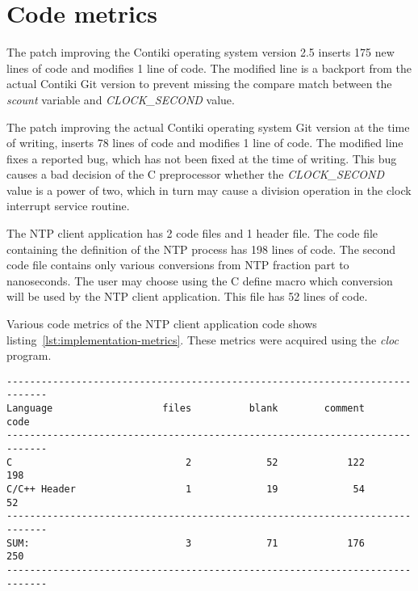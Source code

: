 
\section{Code metrics}
The patch improving the Contiki operating system version 2.5
inserts 175 new lines of code and modifies 1 line of code.
The modified line is a backport from the actual Contiki Git version to prevent
missing the compare match between the {\it{scount}} variable and {\it{CLOCK\_SECOND}} value.

The patch improving the actual Contiki operating system Git version at the time of writing,
inserts 78 lines of code and modifies 1 line of code.
The modified line fixes a reported bug, which has not been fixed at the time of writing.
This bug causes a bad decision of the C preprocessor whether the {\it{CLOCK\_SECOND}}
value is a power of two, which in turn may cause a division operation in
the clock interrupt service routine.

The NTP client application has 2 code files and 1 header file.
The code file containing the definition of the NTP process
has 198 lines of code.
The second code file contains only various conversions from NTP fraction part
to nanoseconds.
The user may choose using the C define macro which conversion will be used
by the NTP client application.
This file has 52 lines of code.

Various code metrics of the NTP client application code
shows listing~\ref{lst:implementation-metrics}.
These metrics were acquired using the {\it{cloc}} program.
\begin{lstlisting}[caption={NTP client application code metrics},label={lst:implementation-metrics}]
-----------------------------------------------------------------------------
Language                   files          blank        comment           code
-----------------------------------------------------------------------------
C                              2             52            122            198
C/C++ Header                   1             19             54             52
-----------------------------------------------------------------------------
SUM:                           3             71            176            250
-----------------------------------------------------------------------------
\end{lstlisting}
